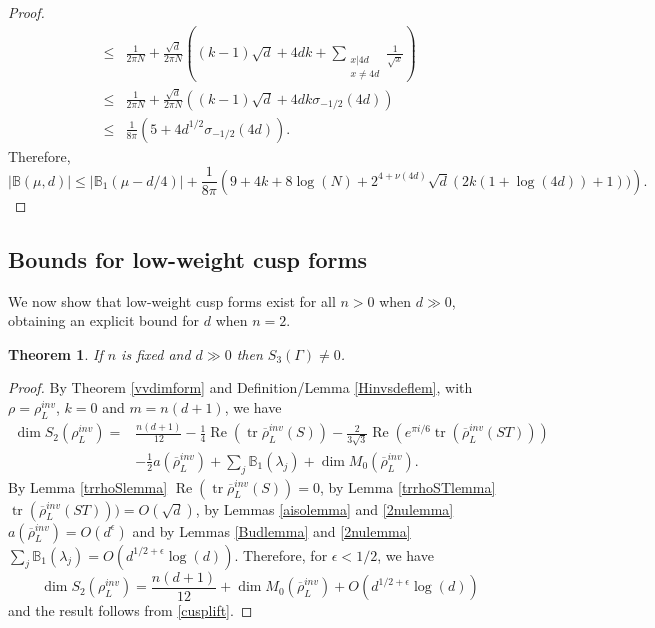 \documentclass[12pt, a4paper]{article}
\newtheorem{thm}{Theorem}[section]
\newcommand{\BB}{\mathbb{B}}
\newcommand{\opn}{\operatorname}
\begin{document}
\begin{proof}
\begin{align*}
      \leq & \frac{1}{2 \pi N} + \frac{\sqrt{d}}{2 \pi N} \left ( (k-1)\sqrt{d} + 4dk + \sum_{\substack{x \vert 4d \\ x \neq 4d}} \frac{1}{\sqrt{x}} \right ) \\
      \leq & \frac{1}{2 \pi N} + \frac{\sqrt{d}}{2 \pi N} \left ( (k-1)\sqrt{d} + 4dk \sigma_{-1/2}(4d) \right ) \\
      \leq & \frac{1}{8 \pi} \left ( 5 + 4d^{1/2}\sigma_{-1/2}(4d) \right ).
    \end{align*}
    Therefore,
    \[
    \vert \BB(\mu, d) \vert
    \leq
    \vert \BB_1(\mu - d/4) \vert
    + \frac{1}{8 \pi} \left (
    9 + 4k + 8 \opn{log}(N) + 2^{4+\nu(4d)}\sqrt{d} ( 2k(1+ \opn{log}(4d)) + 1))
    \right ).
    \]
\end{proof}
\subsection{Bounds for low-weight cusp forms}
We now show that low-weight cusp forms exist for all $n>0$ when $d \gg 0$, obtaining an explicit bound for $d$ when $n=2$.
\begin{thm}\label{cuspthm}
  If $n$ is fixed and $d \gg 0$ then $S_3(\Gamma) \neq 0$.
\end{thm}
\begin{proof}
  By Theorem \ref{vvdimform} and Definition/Lemma \ref{Hinvsdeflem},  with $\rho=\rho^{inv}_L$, $k = 0 $ and $m = n(d+1)$, we have 
  \begin{align*}
    \opn{dim} S_2(\rho_L^{inv})
    = & \frac{n(d+1)}{12} - \frac{1}{4} \opn{Re}( \opn{tr} \overline{\rho}^{inv}_L(S))
    - \frac{2}{3 \sqrt{3}} \opn{Re}( e^{\pi i /6} \opn{tr}(\overline{\rho}^{inv}_L(ST))) \\
    & - \frac{1}{2} a(\overline{\rho}^{inv}_L) + \sum_j \BB_1(\lambda_j) + \opn{dim}M_0(\overline{\rho}_L^{inv}).
  \end{align*}
  By Lemma \ref{trrhoSlemma} $\opn{Re}( \opn{tr} \overline{\rho}^{inv}_L(S)) = 0$,
  by Lemma \ref{trrhoSTlemma} $\opn{tr}(\overline{\rho}^{inv}_L(ST))) = O(\sqrt{d})$,
  by Lemmas \ref{aisolemma} and \ref{2nulemma} $a(\overline{\rho}^{inv}_L) = O(d^{\epsilon})$
  and by Lemmas \ref{Budlemma} and \ref{2nulemma} $\sum_j \BB_1(\lambda_j) = O(d^{1/2 + \epsilon}\opn{log}(d))$. 
Therefore, for $\epsilon<1/2$, we have
  \[
    \opn{dim} S_2(\rho_L^{inv})
    = \frac{n(d+1)}{12} +\opn{dim} M_0(\overline{\rho}_L^{inv}) +  O(d^{1/2 + \epsilon} \opn{log}(d))
    \]
    and the result follows from \eqref{cusplift}.
\end{proof}
\end{document}
